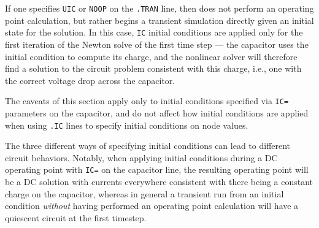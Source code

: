 If one specifies \texttt{UIC} or \texttt{NOOP} on the \texttt{.TRAN}
line, then \Xyce{} does not perform an operating point calculation,
but rather begins a transient simulation directly given an initial
state for the solution.  In this case, \texttt{IC} initial conditions
are applied only for the first iteration of the Newton solve of the
first time step --- the capacitor uses the initial condition to
compute its charge, and the nonlinear solver will therefore find a
solution to the circuit problem consistent with this charge, i.e., one
with the correct voltage drop across the capacitor.

The caveats of this section apply only to initial conditions specified
via \texttt{IC=} parameters on the capacitor, and do not affect how
initial conditions are applied when using \texttt{.IC} lines to
specify initial conditions on node values.

The three different ways of specifying initial conditions can lead to
different circuit behaviors.  Notably, when applying initial
conditions during a DC operating point with \texttt{IC=} on the
capacitor line, the resulting operating point will be a DC solution
with currents everywhere consistent with there being a constant charge
on the capacitor, whereas in general a transient run from an initial
condition {\em without\/} having performed an operating point
calculation will have a quiescent circuit at the first timestep.

